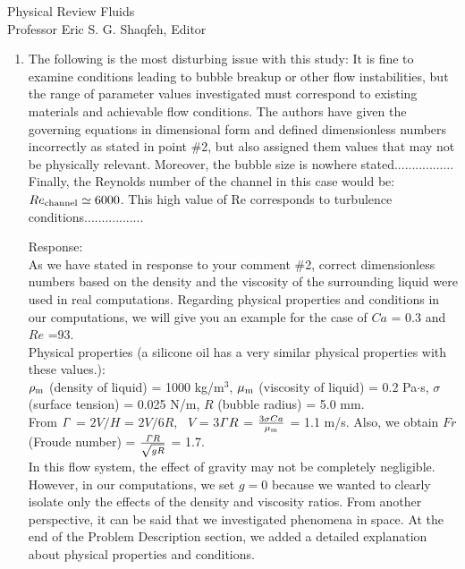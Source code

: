 \documentclass{letter}
\begin{document}
\begin{letter}{
Physical Review Fluids\\
Professor Eric S. G. Shaqfeh, Editor\\}
\begin{enumerate}
\par\noindent
\item
\textsf
{The following is the most disturbing issue with this study: It is fine to
examine conditions leading to bubble breakup or other flow instabilities, but
the range of parameter values investigated must correspond to existing
materials and achievable flow conditions.  The authors have given the governing
equations in dimensional form and defined dimensionless numbers incorrectly as
stated in point \#2, but also assigned them values that may not be physically
relevant. Moreover, the bubble size is nowhere stated.................\\
Finally, the Reynolds number of the channel in this case would be: $Re_{\rm
channel} \simeq 6000$.  This high value of Re corresponds to turbulence
conditions.................}
\vspace{3 mm}

Response: \\
As we have stated in response to your comment \#2, correct dimensionless
numbers based on the density and the viscosity of the surrounding liquid were
used in real computations.  Regarding physical properties and conditions in our
computations, we will give you an example for the case of $Ca$ = 0.3 and $Re$
=93.\\

Physical properties (a silicone oil has a very similar physical properties with these values.):\\
\quad $\rho_{\rm m}$ (density of liquid) = 1000 kg/m$^3$, $\mu_{\rm m}$ (viscosity of liquid) = 0.2 Pa$\cdot$s,
$\sigma$ (surface tension) = 0.025 N/m, $R$ (bubble radius) = 5.0 mm.\\
From ${\it \Gamma}$ = $2V/H$ = $2V/6R$, \  $V$ = 3${\it \Gamma} R$ = $\frac{3\sigma Ca}{\mu_{\rm m}} $ = 1.1 m/s.
Also, we obtain $Fr$ (Froude number) = $\frac{{\it \Gamma}R}{\sqrt {gR}}$ = 1.7. \\
In this flow system, the effect of gravity may not be completely negligible. However, in our computations, 
we set $g = 0$ because we wanted to clearly isolate only the effects of 
the density and viscosity ratios. 
From another perspective, it can be said that we investigated 
phenomena in space.
At the end of the Problem Description section, we added a detailed explanation about physical properties and conditions.


\end{enumerate}
\end{letter}
\end{document}
